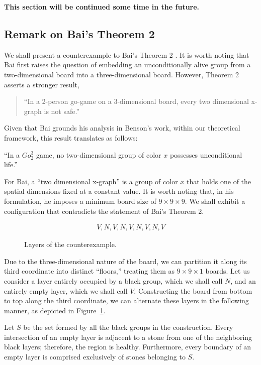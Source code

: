 \textbf{This section will be continued some time in the future.}

\vspace{1cm}
\subsection{Remark on Bai's Theorem 2}
We shall present a counterexample to Bai's Theorem 2 \cite{KJB1, KJB2}. It is worth noting that Bai first raises the question of embedding an unconditionally alive group from a two-dimensional board into a three-dimensional board. However, Theorem 2 asserts a stronger result,

\begin{quote}
	``In a 2-person go-game on a 3-dimensional board, every two dimensional x-graph is not safe.''
\end{quote}

Given that Bai grounds his analysis in Benson's work, within our theoretical framework, this result translates as follows:

``In a \(Go_{2}^{3}\) game, no two-dimensional group of color \(x\) possesses unconditional life.''

For Bai, a ``two dimensional x-graph'' is a group of color \(x\) that holds one of the spatial dimensions fixed at a constant value. It is worth noting that, in his formulation, he imposes a minimum board size of \(9 \times 9 \times 9\). We shall exhibit a configuration that contradicts the statement of Bai's Theorem 2.

\begin{figure}
	\vspace{-15pt}
	\begin{align*}
		V,N,V,N,V,N,V,N,V
	\end{align*}
	\caption{Layers of the counterexample.}
	\label{contraej_bai}
\end{figure}Due to the three-dimensional nature of the board, we can partition it along its third coordinate into distinct ``floors,'' treating them as \(9\times 9 \times 1\) boards. Let us consider a layer entirely occupied by a black group, which we shall call \(N\), and an entirely empty layer, which we shall call \(V\). Constructing the board from bottom to top along the third coordinate, we can alternate these layers in the following manner, as depicted in Figure~\ref{contraej_bai}. 

Let \(S\) be the set formed by all the black groups in the construction. Every intersection of an empty layer is adjacent to a stone from one of the neighboring black layers; therefore, the region is healthy. Furthermore, every boundary of an empty layer is comprised exclusively of stones belonging to \(S\).

